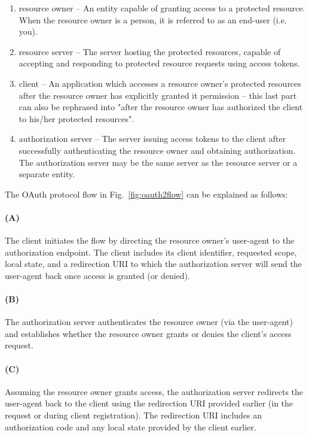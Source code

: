 \documentclass[a4paper]{llncs}
\begin{document}
\begin{enumerate}
\item resource owner -- An entity capable of granting access to a protected resource. When the resource owner is a person, it is referred to as an end-user (i.e. you).

\item resource server -- The server hosting the protected resources, capable of accepting and responding to protected resource requests using access tokens.

\item client -- An application which accesses a resource owner's protected resources after the resource owner has explicitly granted it permission -- this last part can also be rephrased into "after the resource owner has authorized the client to his/her protected resources".

\item authorization server -- The server issuing access tokens to the client after successfully authenticating the resource owner and obtaining authorization. The authorization server may be the same server as the resource server or a separate entity.
\end{enumerate}

The OAuth protocol flow in Fig.~\ref{fig:oauth2flow} can be explained as follows:

\paragraph*{(A)} The client initiates the flow by directing the resource owner's user-agent to the authorization endpoint. The client includes         its client identifier, requested scope, local state, and a redirection URI to which the authorization server will send the user-agent back once access is granted (or denied).

\paragraph*{(B)} The authorization server authenticates the resource owner (via the user-agent) and establishes whether the resource owner grants or denies the client's access request.

\paragraph*{(C)} Assuming the resource owner grants access, the authorization server redirects the user-agent back to the client using the redirection URI provided earlier (in the request or during client registration). The redirection URI includes an authorization code and any local state provided by the client earlier.
\end{document}
